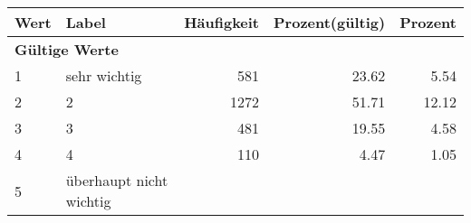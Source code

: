      \begin{longtable}{lXrrr}
     \toprule
     \textbf{Wert} & \textbf{Label} & \textbf{Häufigkeit} & \textbf{Prozent(gültig)} & \textbf{Prozent} \\
     \endhead
     \midrule
     \multicolumn{5}{l}{\textbf{Gültige Werte}}\\

     1 &
     \multicolumn{1}{X}{ sehr wichtig   } &


       \num{581} &
       \num[round-mode=places,round-precision=2]{23,62} &
         \num[round-mode=places,round-precision=2]{5,54} \\

     2 &
     \multicolumn{1}{X}{ 2   } &


       \num{1272} &
       \num[round-mode=places,round-precision=2]{51,71} &
         \num[round-mode=places,round-precision=2]{12,12} \\

     3 &
     \multicolumn{1}{X}{ 3   } &


       \num{481} &
       \num[round-mode=places,round-precision=2]{19,55} &
         \num[round-mode=places,round-precision=2]{4,58} \\

     4 &
     \multicolumn{1}{X}{ 4   } &


       \num{110} &
       \num[round-mode=places,round-precision=2]{4,47} &
         \num[round-mode=places,round-precision=2]{1,05} \\

     5 &
     \multicolumn{1}{X}{ überhaupt nicht wichtig   } &



\end{longtable}
